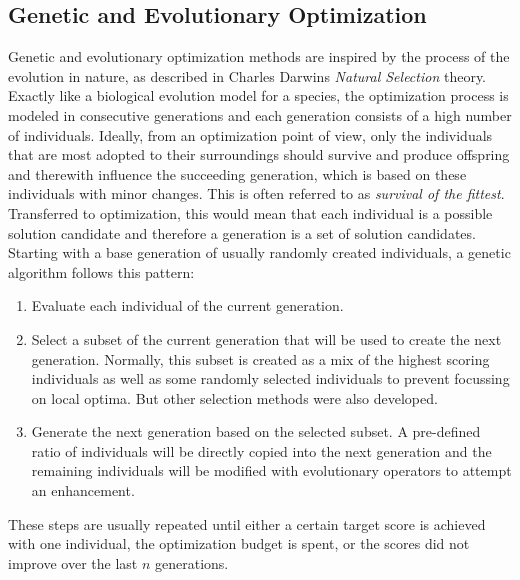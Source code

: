 \subsection{Genetic and Evolutionary Optimization}
\label{sec:theory:optimization:genetic}
Genetic and evolutionary optimization methods are inspired by the process of the evolution in nature, as described in Charles Darwins \textit{Natural Selection} theory.
Exactly like a biological evolution model for a species, the optimization process is modeled in consecutive generations and each generation consists of a high number of individuals.
Ideally, from an optimization point of view, only the individuals that are most adopted to their surroundings should survive and produce offspring and therewith influence the succeeding generation, which is based on these individuals with minor changes.
This is often referred to as \textit{survival of the fittest}.\newline
Transferred to optimization, this would mean that each individual is a possible solution candidate and therefore a generation is a set of solution candidates.
Starting with a base generation of usually randomly created individuals, a genetic algorithm follows this pattern:
\begin{enumerate}
    \item Evaluate each individual of the current generation.
    \item Select a subset of the current generation that will be used to create the next generation. Normally, this subset is created as a mix of the highest scoring individuals as well as some randomly selected individuals to prevent focussing on local optima. But other selection methods were also developed.
    \item Generate the next generation based on the selected subset. A pre-defined ratio of individuals will be directly copied into the next generation and the remaining individuals will be modified with evolutionary operators to attempt an enhancement.
\end{enumerate}
These steps are usually repeated until either a certain target score is achieved with one individual, the optimization budget is spent, or the scores did not improve over the last $n$ generations.

